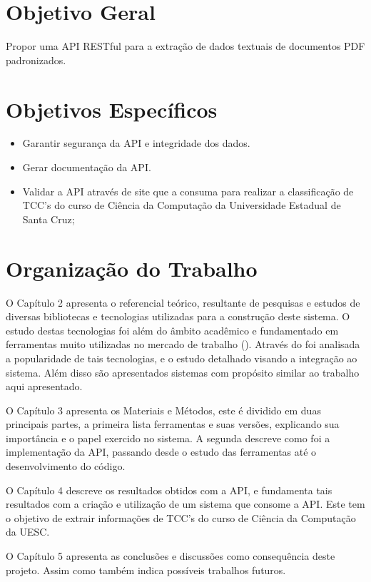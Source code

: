 \section{Objetivo Geral}

Propor uma API RESTful para a extração de dados textuais de documentos PDF padronizados.

\section{Objetivos Específicos}

\begin{itemize}
\item Garantir segurança da API e integridade dos dados.

\item Gerar documentação da API.

\item Validar a API através de site que a consuma para realizar a classificação de TCC's do curso de Ciência da Computação da Universidade Estadual de Santa Cruz;

\end{itemize}

\section{Organização do Trabalho}

O Capítulo 2 apresenta o referencial teórico, resultante de pesquisas e estudos de diversas bibliotecas e tecnologias utilizadas para a construção deste sistema. O estudo destas tecnologias foi além do âmbito acadêmico e fundamentado em ferramentas muito utilizadas no mercado de trabalho (\hspace{1sp}\cite{stack}). Através do \cite{stackTrends} foi analisada a popularidade de tais tecnologias, e o estudo detalhado visando a integração ao sistema. Além disso são apresentados sistemas com propósito similar ao trabalho aqui apresentado.

O Capítulo 3 apresenta os Materiais e Métodos, este é dividido em duas principais partes, a primeira lista ferramentas e suas versões, explicando sua importância e o papel exercido no sistema. A segunda descreve como foi a implementação da API, passando desde o estudo das ferramentas até o desenvolvimento do código.

O Capítulo 4 descreve os resultados obtidos com a API, e fundamenta tais resultados com a criação e utilização de um sistema que consome a API. Este tem o objetivo de extrair informações de TCC's do curso de Ciência da Computação da UESC.

O Capítulo 5 apresenta as conclusões e discussões como consequência deste projeto. Assim como também indica possíveis trabalhos futuros.
